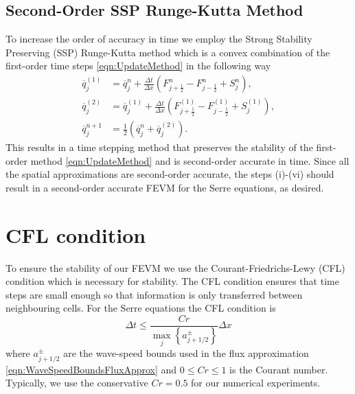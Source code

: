 \subsection{Second-Order SSP Runge-Kutta Method}
To increase the order of accuracy in time we employ the Strong Stability Preserving (SSP) Runge-Kutta method \cite{Gottlieb-etal-2003-89} which is a convex combination of the first-order time steps \eqref{eqn:UpdateMethod} in the following way
\begin{subequations}
\begin{align}
\overline{q}_j^{(1)} &= \overline{q}^{n}_j + \frac{\Delta t}{\Delta x} \left(F^n_{j+\frac{1}{2}} - F^n_{j-\frac{1}{2}} + S^n_j\right),\\
\overline{q}_j^{(2)} &= \overline{q}_j^{(1)} + \frac{\Delta t}{\Delta x} \left(F_{j+\frac{1}{2}}^{(1)} - F_{j-\frac{1}{2}}^{(1)}  + S_j^{(1)} \right), \\
\overline{q}^{n+1}_j &= \frac{1}{2} \left( \overline{q}^n_j +  \overline{q}_j^{(2)}  \right).
\end{align}
\label{eqn:SSPRKStep1}
\end{subequations}
This results in a time stepping method that preserves the stability of the first-order method \eqref{eqn:UpdateMethod} and is second-order accurate in time. Since all the spatial approximations are second-order accurate, the steps (i)-(vi) should result in a second-order accurate FEVM for the Serre equations, as desired. 


\section{CFL condition}
To ensure the stability of our FEVM we use the Courant-Friedrichs-Lewy (CFL) condition \cite{Courant-etal-1967-215} which is necessary for stability. The CFL condition ensures that time steps are small enough so that information is only transferred between neighbouring cells. For the Serre equations the CFL condition is 
\begin{equation}
\Delta t \le \frac{Cr }{\max_{j} \left\lbrace a^\pm_{j+1/2} \right\rbrace} \Delta x
\label{eqn:CFLcond}
\end{equation}
where $a^\pm_{j+1/2} $ are the wave-speed bounds used in the flux approximation \eqref{eqn:WaveSpeedBoundsFluxApprox} and $0\le Cr \le 1$ is the Courant number. Typically, we use the conservative $Cr = 0.5$ for our numerical experiments. 

